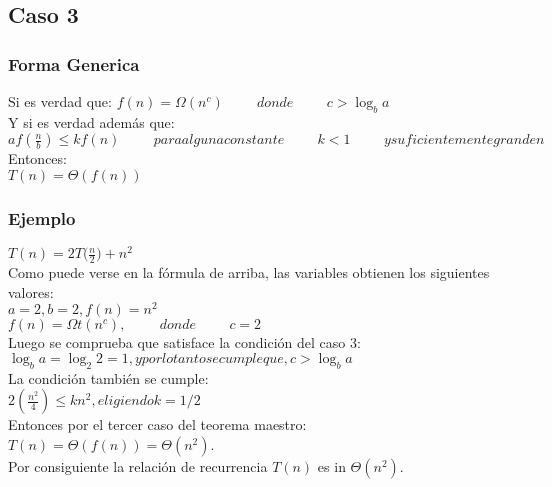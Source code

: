\documentclass[12pt]{article}
\begin{document}
\subsection*{Caso 3}
\subsubsection*{Forma Generica}
Si es verdad que:
$f(n)=\Omega(n^{c}) \hspace{1cm} donde \hspace{1cm} c>\log_{b}a$\\
Y si es verdad además que:\\
$af({\frac{n}{b}})\leq kf(n) \hspace{1cm} para alguna constante \hspace{1cm} k<1 \hspace{1cm} y suficientemente grande n$\\
Entonces:\\
$T(n)=\Theta (f(n))$
\subsubsection*{Ejemplo}
$T(n)=2T({\frac{n}{2})+n^{2}}$\\
Como puede verse en la fórmula de arriba, las variables obtienen los siguientes valores:\\
$a=2, b=2, f(n)=n^{2}$\\
$f(n)=\Omega t(n^{c}), \hspace{1cm} donde \hspace{1cm} c=2$\\
Luego se comprueba que satisface la condición del caso 3:\\
$\log_{b}a=\log_{2}2=1,y por lo tanto se cumple que, c>\log_{b}a$\\
La condición también se cumple:\\
$2({\frac{n^{2}}{4}})\leq kn^{2}, eligiendo k=1/2$\\
Entonces por el tercer caso del teorema maestro:\\
$T(n)=\Theta(f(n))=\Theta(n^{2})$.\\
Por consiguiente la relación de recurrencia $T(n)$ es in $\Theta(n^2)$.\\
\cite{Theorem1998}
\cite{wikipedia2019}
\cite{Cormen2001}
\printbibliography[]
\end{document}

